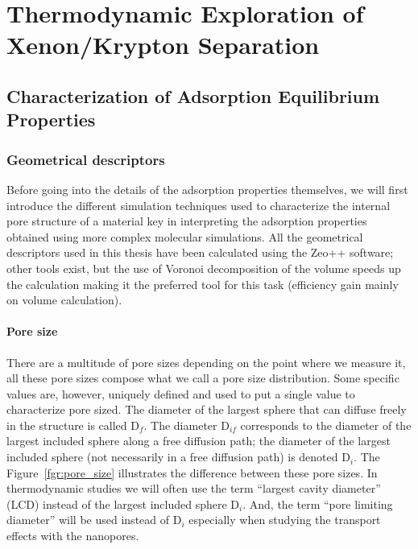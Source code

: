 \documentclass[main.tex]{subfiles}
\begin{document}
\chapter{Thermodynamic Exploration of Xenon/Krypton Separation}
\vspace*{-1\baselineskip}

\section{Characterization of Adsorption Equilibrium Properties}

\subsection{Geometrical descriptors}

Before going into the details of the adsorption properties themselves, we will first introduce the different simulation techniques used to characterize the internal pore structure of a material key in interpreting the adsorption properties obtained using more complex molecular simulations. All the geometrical descriptors used in this thesis have been calculated using the Zeo++ software;\autocite{Zeo++} other tools exist,\autocite{First_2013,PoreBlazer} but the use of Voronoi decomposition of the volume speeds up the calculation making it the preferred tool for this task (efficiency gain mainly on volume calculation).\autocite{Rycroft_2009} 

\subsubsection{Pore size}

There are a multitude of pore sizes depending on the point where we measure it, all these pore sizes  compose what we call a pore size distribution. Some specific values are, however, uniquely defined and used to put a single value to characterize pore sized. The diameter of the largest sphere that can diffuse freely in the structure is called D$_f$. The diameter D$_{if}$ corresponds to the diameter of the largest included sphere along a free diffusion path; the diameter of the largest included sphere (not necessarily in a free diffusion path) is denoted D$_i$. The Figure~\ref{fgr:pore_size} illustrates the difference between these pore sizes. In thermodynamic studies we will often use the term ``largest cavity diameter'' (LCD) instead of the largest included sphere D$_i$. And, the term ``pore limiting diameter'' will be used instead of D$_i$ especially when studying the transport effects with the nanopores.
\end{document}
